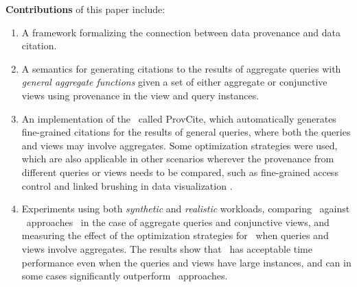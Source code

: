 
{\textbf{Contributions}} of this paper include:
\begin{enumerate}
\item A framework formalizing the connection between data provenance and data citation.
\item %
A semantics for generating citations to the results of aggregate queries with {\em general aggregate functions} given a set of either aggregate or conjunctive views using provenance in the view and query instances. 
\item An implementation of the \pba\ called ProvCite, which automatically generates fine-grained citations for the results of general queries, where both the queries and views may involve aggregates. Some optimization strategies were used, which are also applicable in other scenarios wherever the provenance from different queries or views needs to be compared, such as fine-grained access control \cite{goyal2006attribute} and linked brushing in data visualization \cite{psallidas2018smoke}.

\item 
Experiments using both {\em synthetic}  and {\em realistic} workloads, comparing 
\provalg\ against \rba\ approaches~\cite{wu2018data} in the case of aggregate queries and conjunctive views, and measuring the effect of the optimization strategies for \provalg\ when queries and views involve aggregates.  
The results show that \provalg\ has acceptable time performance even when the queries and views have large instances, and can in some cases significantly outperform \rba\ approaches.
\end{enumerate}

